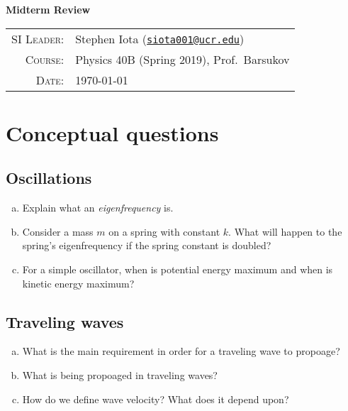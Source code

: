 \documentclass[11pt]{article}
\newcommand{\email}[1]{\texttt{\href{mailto:#1}{#1}}}
\begin{document}
\begin{center}

\Large{\textbf{Midterm Review}}
\end{center}
\vspace{.5mm}



\begin{tabular}{rl}
\textsc{SI Leader}:
&
Stephen Iota (\email{siota001@ucr.edu})
\\
\textsc{Course}:
&
Physics 40B (Spring 2019), Prof.~Barsukov
\\
\textsc{Date}:
&
\today
\end{tabular}



\section{Conceptual questions}

\subsection{Oscillations}

\begin{enumerate}[(a)]
	\item Explain what an \emph{eigenfrequency} is.
	\item Consider a mass $m$ on a spring with constant $k$. What will happen to the spring's   eigenfrequency if the spring constant is doubled?
	\item For a simple oscillator, when is potential energy maximum and when is kinetic energy maximum?
\end{enumerate}






\subsection{Traveling waves}
\begin{enumerate}[(a)]
	\item What is the main requirement in order for a traveling wave to propoage?
	\item What is being propoaged in traveling waves?
	\item How do we define wave velocity? What does it depend upon?
\end{enumerate}
\end{document}
